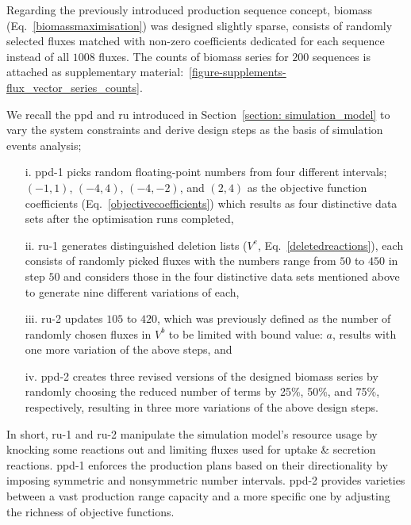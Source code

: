 Regarding the previously introduced production sequence concept, biomass (Eq.~\ref{biomassmaximisation}) was designed slightly sparse, consists of randomly selected fluxes matched with non-zero coefficients dedicated for each sequence instead of all $1008$ fluxes. The counts of biomass series for $200$ sequences is attached as supplementary material:~\ref{figure-supplements-flux_vector_series_counts}.

We recall the \acf{ppd} and \acf{ru} introduced in Section~\ref{section: simulation_model} to vary the system constraints and derive design steps as the basis of simulation events analysis;
\begin{itemize}
	\item[i.] \acs{ppd}-1 picks random floating-point numbers from four different intervals; $(-1, 1)$, $(-4, 4)$, $(-4, -2)$, and $(2, 4)$ as the objective function coefficients (Eq.~\ref{objectivecoefficients}) which results as four distinctive data sets after the optimisation runs completed,
	\item[ii.] \acs{ru}-1 generates distinguished deletion lists ($V^{e}$, Eq.~\ref{deletedreactions}), each consists of randomly picked fluxes with the numbers range from $50$ to $450$ in step $50$ and considers those in the four distinctive data sets mentioned above to generate nine different variations of each,
	\item[iii.] \acs{ru}-2 updates $105$ to $420$, which was previously defined as the number of randomly chosen fluxes in $V^{b}$ to be limited with bound value: $a$, results with one more variation of the above steps, and
	\item[iv.] \acs{ppd}-2 creates three revised versions of the designed biomass series by randomly choosing the reduced number of terms by 25\%, 50\%, and 75\%, respectively, resulting in three more variations of the above design steps.
\end{itemize}

In short, \acs{ru}-1 and \acs{ru}-2 manipulate the simulation model's resource usage by knocking some reactions out and limiting fluxes used for uptake \& secretion reactions. \acs{ppd}-1 enforces the production plans based on their directionality by imposing symmetric and nonsymmetric number intervals. \acs{ppd}-2 provides varieties between a vast production range capacity and a more specific one by adjusting the richness of objective functions. %

